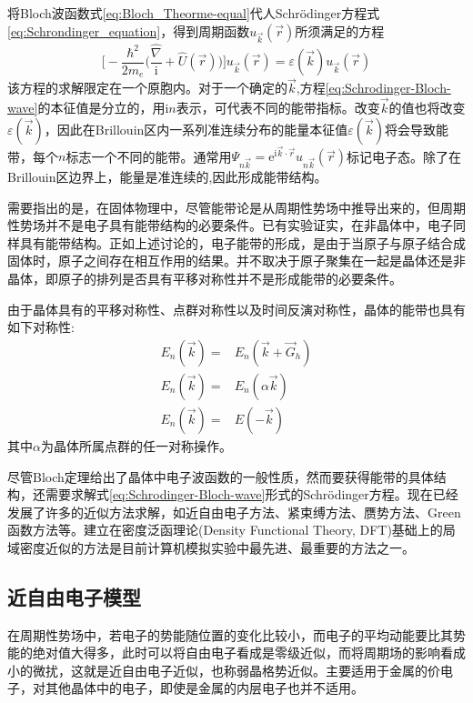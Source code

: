 将Bloch波函数式\eqref{eq:Bloch_Theorme-equal}代人Schr\"odinger方程式\eqref{eq:Schrondinger_equation}，得到周期函数$u_{\vec k}(\vec r)$所须满足的方程
\begin{equation}
	\bigg[-\dfrac{\hbar^2}{2m_e}\bigg(\dfrac{\hat{\nabla}}{\mathrm{i}}+\hat{U}(\vec r)\bigg)\bigg]u_{\vec k}(\vec r)=\varepsilon(\vec k)u_{\vec k}(\vec r)
	\label{eq:Schrodinger-Bloch-wave}
\end{equation}
该方程的求解限定在一个原胞内。对于一个确定的$\vec k$,方程\eqref{eq:Schrodinger-Bloch-wave}的本征值是分立的，用i$n$表示，可代表不同的能带指标。改变$\vec k$的值也将改变$\varepsilon(\vec k)$，因此在Brillouin区内一系列准连续分布的能量本征值$\varepsilon(\vec k)$将会导致能带，每个$n$标志一个不同的能带。通常用$\Psi_{n\vec k}=\mathrm{e}^{\mathrm{i}\vec k\cdot\vec r}u_{n\vec k}(\vec r)$标记电子态。除了在Brillouin区边界上，能量是准连续的,因此形成能带结构。%

需要指出的是，在固体物理中，尽管能带论是从周期性势场中推导出来的，但周期性势场并不是电子具有能带结构的必要条件。已有实验证实，在非晶体中，电子同样具有能带结构。正如上述讨论的，电子能带的形成，是由于当原子与原子结合成固体时，原子之间存在相互作用的结果。并不取决于原子聚集在一起是晶体还是非晶体，即原子的排列是否具有平移对称性并不是形成能带的必要条件。

由于晶体具有的平移对称性、点群对称性以及时间反演对称性，晶体的能带也具有如下对称性:
\begin{equation}
	\begin{aligned}
		E_n(\vec k)=&E_n(\vec k+\vec G_h)\\
		E_n(\vec k)=&E_n(\alpha\vec k)\\
E_n(\vec k)=&E(-\vec k)
	\end{aligned}
	\label{eq:E_band-symmetry}
\end{equation}
其中$\alpha$为晶体所属点群的任一对称操作。

尽管Bloch定理给出了晶体中电子波函数的一般性质，然而要获得能带的具体结构，还需要求解式\eqref{eq:Schrodinger-Bloch-wave}形式的Schr\"odinger方程。现在已经发展了许多的近似方法求解，如近自由电子方法、紧束缚方法、赝势方法、Green函数方法等。建立在密度泛函理论(Density Functional Theory, DFT)基础上的局域密度近似的方法是目前计算机模拟实验中最先进、最重要的方法之一。%

\subsection{近自由电子模型} 
在周期性势场中，若电子的势能随位置的变化比较小，而电子的平均动能要比其势能的绝对值大得多，此时可以将自由电子看成是零级近似，而将周期场的影响看成小的微扰，这就是近自由电子近似，也称弱晶格势近似。主要适用于金属的价电子，对其他晶体中的电子，即使是金属的内层电子也并不适用。

